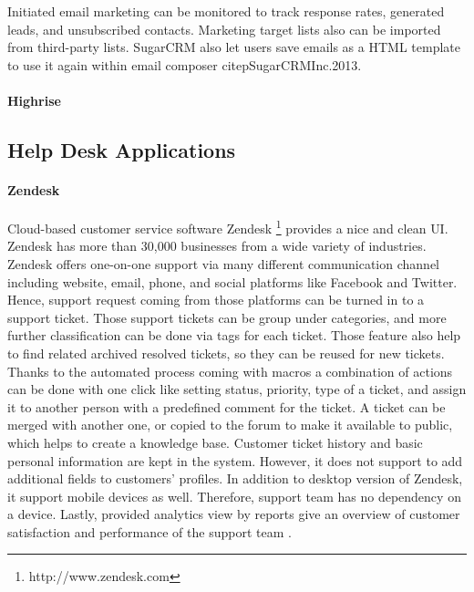 Initiated email marketing can be monitored to track response rates, generated leads, and unsubscribed contacts. Marketing target lists also can be imported from third-party lists. SugarCRM also let users save emails as a \ac{HTML} template to use it again within email composer citep{SugarCRMInc.2013}. 

\paragraph{Highrise}


\subsection{Help Desk Applications}
\label{subsec:3.3.2:HelpDeskAppl}


\paragraph{Zendesk}
Cloud-based customer service software Zendesk \footnote{http://www.zendesk.com} provides a nice and clean \ac{UI}. Zendesk has more than 30,000 businesses from a wide variety of industries. Zendesk offers one-on-one support via many different communication channel including website, email, phone, and social platforms like Facebook and Twitter. Hence, support request coming from those platforms can be turned in to a support ticket. Those support tickets can be group under categories, and more further classification can be done via tags for each ticket. Those feature also help to find related archived resolved tickets, so they can be reused for new tickets. Thanks to the automated process coming with macros a combination of actions can be done with one click like setting status, priority, type of a ticket, and assign it to another person with a predefined comment for the ticket. A ticket can be merged with another one, or copied to the forum to make it available to public, which helps to create a knowledge base. Customer ticket history and basic personal information are kept in the system. However, it does not support to add additional fields to customers' profiles. In addition to desktop version of Zendesk, it support mobile devices as well. Therefore, support team has no dependency on a device. Lastly, provided analytics view by reports give an overview of customer satisfaction and performance of the support team \citep{Zendesk2013,Zendesk2013a}.

